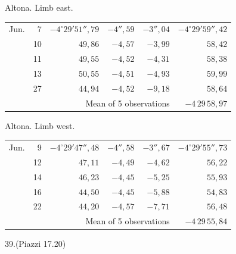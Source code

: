 \noindent\begin{minipage}[t]{.495\textwidth}\centering Altona. Limb east.\par\smallskip
{\scriptsize\setlength{\tabcolsep}{1pt}\renewcommand{\arraystretch}{1.2}\begin{tabular}{lr|r|r|r|r|}
Jun.&7&$-4^\circ29'51''{,}79$&$-4''{,}59$&$-3''{,}04$&$-4^\circ29'59''{,}42$\\
&10&$49{,}86$&$-4{,}57$&$-3{,}99$&$58{,}42$\\
&11&$49{,}55$&$-4{,}52$&$-4{,}31$&$58{,}38$\\
&13&$50{,}55$&$-4{,}51$&$-4{,}93$&$59{,}99$\\
&27&$44{,}94$&$-4{,}52$&$-9{,}18$&$58{,}64$\\
\cline{6-6}\multicolumn{5}{r}{Mean of 5 observations}&$-4\,29\,58{,}97$
\end{tabular}}\end{minipage}\hfill\begin{minipage}[t]{.495\textwidth}\centering Altona. Limb west.\par\smallskip
{\scriptsize\setlength{\tabcolsep}{1pt}\renewcommand{\arraystretch}{1.2}\begin{tabular}{lr|r|r|r|r}
Jun.&9&$-4^\circ29'47''{,}48$&$-4''{,}58$&$-3''{,}67$&$-4^\circ29'55''{,}73$\\
&12&$47{,}11$&$-4{,}49$&$-4{,}62$&$56{,}22$\\
&14&$46{,}23$&$-4{,}45$&$-5{,}25$&$55{,}93$\\
&16&$44{,}50$&$-4{,}45$&$-5{,}88$&$54{,}83$\\
&22&$44{,}20$&$-4{,}57$&$-7{,}71$&$56{,}48$\\
\cline{6-6}\multicolumn{5}{r}{Mean of 5 observations}&$-4\,29\,55{,}84$
\end{tabular}}\end{minipage}
\par\vspace{4mm}
\begin{center}39.\quad (Piazzi 17.20)\end{center}

